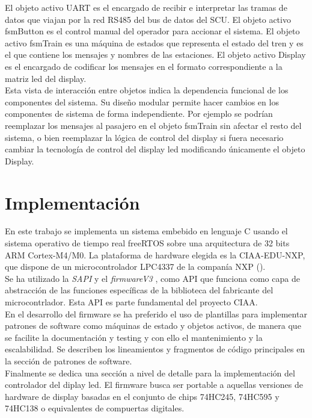 El objeto activo UART es el encargado de recibir e interpretar las tramas de datos que viajan por la red RS485 del bus de datos del SCU. El objeto activo fsmButton es el control manual del operador para accionar el sistema. El objeto activo fsmTrain es una máquina de estados que representa el estado del tren y es el que contiene los mensajes y nombres de las estaciones. El objeto activo Display es el encargado de codificar los mensajes en el formato correspondiente a la matriz led del display.\\

Esta vista de interacción entre objetos indica la dependencia funcional de los componentes del sistema. Su diseño modular permite hacer cambios en los componentes de sistema de forma independiente. Por ejemplo se podrían reemplazar los mensajes al pasajero en el objeto fsmTrain sin afectar el resto del sistema, o bien reemplazar la lógica de control del display si fuera necesario cambiar la tecnología de control del display led modificando únicamente el objeto Display.\\


\section{Implementación}
En este trabajo se implementa un sistema embebido en lenguaje C usando el sistema operativo de tiempo real freeRTOS sobre una arquitectura de 32 bits ARM Cortex-M4/M0. La plataforma de hardware elegida es la CIAA-EDU-NXP, que dispone de un microcontrolador LPC4337 de la companía NXP (\cite{NXPLPC4337}).\\
 
Se ha utilizado la \textit{SAPI} y el \textit{firmwareV3} \cite{firmwarev3}, como API que funciona como capa de abstracción de las funciones específicas de la biblioteca del fabricante del microcontrlador. Esta API es parte fundamental del proyecto CIAA.\\
 
En el desarrollo del firmware se ha preferido el uso de plantillas para implementar patrones de software como máquinas de estado y objetos activos, de manera que se facilite la documentación y testing y con ello el mantenimiento y la escalabilidad. Se describen los lineamientos y fragmentos de código principales en la sección de patrones de software.\\

Finalmente se dedica una sección a nivel de detalle para la implementación del controlador del diplay led. El firmware busca ser portable a aquellas versiones de hardware de display basadas en el conjunto de chips 74HC245, 74HC595 y 74HC138 o equivalentes de compuertas digitales. \\


